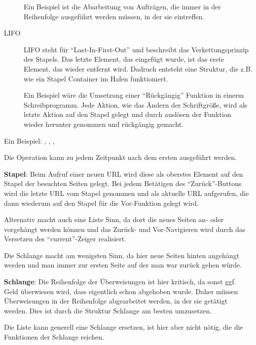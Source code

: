 \begin{aufgabe}[subtitle=Verkettungsprinzipien]
\begin{loesung}
\begin{teilaufgaben}
\begin{description}
				Ein Beispiel ist die Abarbeitung von Aufträgen, die immer in der Reihenfolge ausgeführt werden müssen, in der sie eintreffen.
				\item[LIFO] LIFO steht für \enquote{Last-In-First-Out} und beschreibt das Verkettungsprinzip des Stapels. Das letzte Element, das eingefügt wurde, ist das erste Element, das wieder entfernt wird. Dadruch entsteht eine Struktur, die z.B. wie ein Stapel Container im Hafen funktioniert.
				
				Ein Beispiel wäre die Umsetzung einer \enquote{Rückgängig} Funktion in einerm Schreibprogramm. Jede Aktion, wie das Ändern der Schriftgröße, wird als letzte Aktion auf den Stapel gelegt und durch auslösen der Funktion wieder herunter genommen und rückgängig gemacht.
			\end{description}
			\teilaufgabe
			Ein Beispiel:
			, , , 
			
			Die  Operation kann zu jedem Zeitpunkt nach dem ersten  ausgeführt werden.
			
			
			\teilaufgabe \begin{smallenumerate}
				\item \textbf{Stapel}: Beim Aufruf einer neuen URL wird diese als oberstes Element auf den Stapel der besuchten Seiten gelegt. Bei jedem Betätigen des \enquote{Zurück}-Buttons wird die letzte URL vom Stapel genommen und als aktuelle URL aufgerufen, die dann wiederum auf den Stapel für die Vor-Funktion gelegt wird.
				
				Alternativ macht auch eine Liste Sinn, da dort die neues Seiten an- oder vorgehängt werden können und das Zurück- und Vor-Navigieren wird durch das Versetzen des \enquote{current}-Zeiger realisiert.
				
				Die Schlange macht am wenigsten Sinn, da hier neue Seiten hinten angehängt werden und man immer zur ersten Seite auf der man war zurück gehen würde.
				\item \textbf{Schlange}: Die Reihenfolge der Überweisungen ist hier kritisch, da sonst ggf. Geld überwiesen wird, dass eigentlich schon abgehoben wurde. Daher müssen Überweisungen in der Reihenfolge abgearbeitet werden, in der sie getätigt werden. Dies ist durch die Struktur Schlange am besten umzusetzen.
				
				Die Liste kann generell eine Schlange ersetzen, ist hier aber nicht nötig, die die Funktionen der Schlange reichen.
				

\end{smallenumerate}
\end{teilaufgaben}
\end{loesung}
\end{aufgabe}
